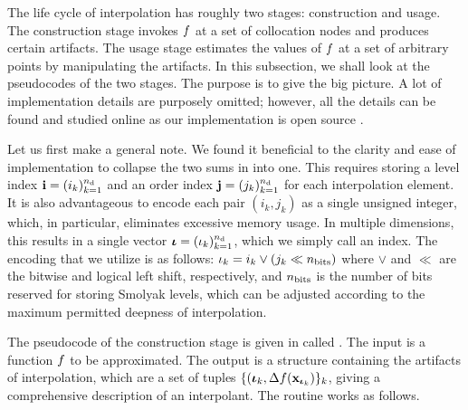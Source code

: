 
The life cycle of interpolation has roughly two stages: construction and usage.
The construction stage invokes $f$ at a set of collocation nodes and produces
certain artifacts. The usage stage estimates the values of $f$ at a set of
arbitrary points by manipulating the artifacts. In this subsection, we shall
look at the pseudocodes of the two stages. The purpose is to give the big
picture. A lot of implementation details are purposely omitted; however, all the
details can be found and studied online as our implementation is open source
\cite{sources}.

Let us first make a general note. We found it beneficial to the clarity and ease
of implementation to collapse the two sums in  into one.
This requires storing a level index $\mathbf{i} = (i_k)_{k = 1}^{n_\text{d}}$ and an order
index $\mathbf{j} = (j_k)_{k = 1}^{n_\text{d}}$ for each interpolation element. It is also
advantageous to encode each pair $(i_k, j_k)$ as a single unsigned integer,
which, in particular, eliminates excessive memory usage. In multiple dimensions,
this results in a single vector ${\bm{\iota}} = (\iota_k)_{k = 1}^{n_\text{d}}$, which we simply
call an index. The encoding that we utilize is as follows: $\iota_k = i_k \lor
(j_k \ll n_\text{bits})$ where $\lor$ and $\ll$ are the bitwise  and
logical left shift, respectively, and $n_\text{bits}$ is the number of bits
reserved for storing Smolyak levels, which can be adjusted according to the
maximum permitted deepness of interpolation.


The pseudocode of the construction stage is given in  called
. The  input is a function $f$ to be
approximated. The  output is a structure containing the
artifacts of interpolation, which are a set of tuples $\{ ({\bm{\iota}}_k,
\Delta f(\mathbf{x}_{{\bm{\iota}}_k}) \}_k$, giving a comprehensive description of an
interpolant. The routine works as follows.

